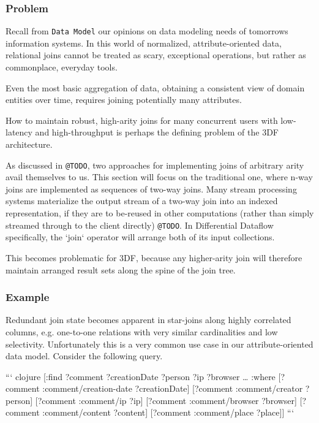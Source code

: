\documentclass[../catalog.tex]{subfiles}
\begin{document}
\subsubsection{Problem}

Recall from \texttt{Data Model} our opinions on data modeling needs of
tomorrows information systems. In this world of normalized,
attribute-oriented data, relational joins cannot be treated as scary,
exceptional operations, but rather as commonplace, everyday tools.

Even the most basic aggregation of data, obtaining a consistent view
of domain entities over time, requires joining potentially many
attributes.

How to maintain robust, high-arity joins for many concurrent users
with low-latency and high-throughput is perhaps the defining problem
of the 3DF architecture.

As discussed in \texttt{@TODO}, two approaches for implementing joins of
arbitrary arity avail themselves to us. This section will focus on the
traditional one, where n-way joins are implemented as sequences of
two-way joins. Many stream processing systems materialize the output
stream of a two-way join into an indexed representation, if they are
to be-reused in other computations (rather than simply streamed
through to the client directly) \texttt{@TODO}. In Differential Dataflow
specifically, the `join` operator will arrange both of its input
collections.

This becomes problematic for 3DF, because any higher-arity join will
therefore maintain arranged result sets along the spine of the join
tree.

\subsubsection{Example}

Redundant join state becomes apparent in star-joins along highly
correlated columns, e.g. one-to-one relations with very similar
cardinalities and low selectivity. Unfortunately this is a very common
use case in our attribute-oriented data model. Consider the following
query.

``` clojure
[:find ?comment ?creationDate ?person ?ip ?browser \ldots{}
 :where
 [?comment :comment/creation-date ?creationDate]
 [?comment :comment/creator ?person]
 [?comment :comment/ip ?ip]
 [?comment :comment/browser ?browser]
 [?comment :comment/content ?content]
 [?comment :comment/place ?place]]
```
\end{document}
